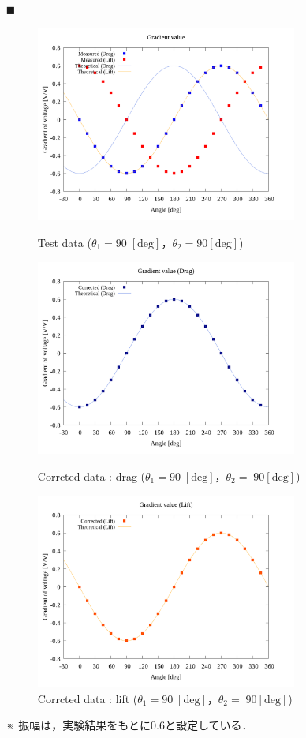 \documentclass[twocolumn,a4j]{jsarticle}
\begin{document}
\newpage

\begin{itemize}
    \item [$\blacksquare$] \\
          \begin{figure}[htbp]
              \footnotesize
              \begin{center}
                  \includegraphics[width=86mm]{../graphes/simulation_900_900/20/20_adjust-value.png}
                  \caption{Test data ($\theta_1 = 90 \; [\mathrm{deg}]$，$\theta_2 = 90 [\mathrm{deg}]$)}
                  \includegraphics[width=86mm]{../graphes/simulation_900_900/21/21-2_corrected_drag.png}
                  \caption{Corrcted data : drag ($\theta_1 = 90 \; [\mathrm{deg}]$，$\theta_2 = \; 90 [\mathrm{deg}]$)}
                  \includegraphics[width=86mm]{../graphes/simulation_900_900/21/21-2_corrected_lift.png}
                  \caption{Corrcted data : lift ($\theta_1 = 90 \; [\mathrm{deg}]$，$\theta_2 = \; 90 [\mathrm{deg}]$)}
                \end{center}
          \end{figure}
    \item [※] 振幅は，実験結果をもとに0.6と設定している．
\end{itemize}
\end{document}
